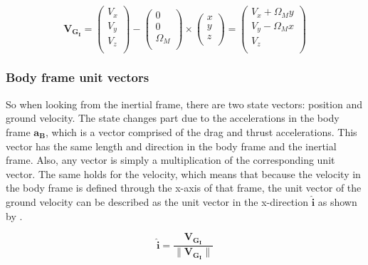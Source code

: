\begin{equation} \label{eq:VGI}
\mathbf{V_{G_{I}}} = 
\begin{pmatrix}
V_{x}\\
V_{y}\\
V_{z}\\
\end{pmatrix}
-
\begin{pmatrix}
0 \\
0 \\
\Omega_{M} \\
\end{pmatrix}
\times
\begin{pmatrix}
x \\
y \\
z \\
\end{pmatrix}=
\begin{pmatrix}
V_{x}+\Omega_{M}y \\
V_{y}-\Omega_{M}x \\
V_{z} \\
\end{pmatrix}
\end{equation}

\subsubsection{Body frame unit vectors}
So when looking from the inertial frame, there are two state vectors: position and ground velocity. The state changes part due to the accelerations in the body frame $\mathbf{a_{B}}$, which is a vector comprised of the drag and thrust accelerations. This vector has the same length and direction in the body frame and the inertial frame. Also, any vector is simply a multiplication of the corresponding unit vector. The same holds for the velocity, which means that because the velocity in the body frame is defined through the x-axis of that frame, the unit vector of the ground velocity can be described as the unit vector in the x-direction $\mathbf{\hat{i}}$ as shown by .

\begin{equation} \label{eq:iHat}
\mathbf{\hat{i}} = \dfrac{\mathbf{V_{G_{I}}}}{\| \mathbf{V_{G_{I}}}\|}
\end{equation}



